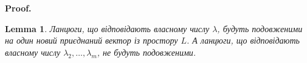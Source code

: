 \documentclass[a4paper, 10pt]{article}
\makeatletter
\def\qed{$\blacksquare$}
\theoremstyle{theoremdd}
\theoremstyle{theoremdd}
\theoremstyle{theoremdd}
\theoremstyle{theoremdd}
\theoremstyle{theoremdd}
\theoremstyle{theoremdd}
\theoremstyle{theoremdd}
\newtheorem{lemma}[theorem]{Lemma}
\theoremstyle{theoremdd}
\renewenvironment{proof}[1][Proof.\\]{\par
\pushQED{\hfill \qed}%
\normalfont \topsep6\p@\@plus6\p@\relax
\trivlist
\item\relax
{\bfseries
#1\@addpunct{.}}\hspace\labelsep\ignorespaces
}{%
\popQED\endtrivlist\@endpefalse
}
\makeatother
\begin{document}
\begin{proof}
\iffalse
\begin{lemma}
$\Im B = L_1 \dot{+} L_2 \dot{+} \dots \dot{+} L_m$.
\end{lemma}

\begin{proof}
Покажемо, що $L_j \cap L_i = \{0\}, j \neq i$. Справді,\\
$z \in L_j \cap L_i \Rightarrow z = \left[\begin{gathered} z^0_j f_j + z^1_j h^1_j + \dots + z_j^{k_j} h_j^{k_j} \\ z_i^0f_i + z_i^1 h_i^1 + \dots + z_i^{k_i} h_i^{k_i} \end{gathered} \right.$\\
$\implies z^0_j f_j + z^1_j h^1_j + \dots + z_j^{k_j} h_j^{k_j} + (-z_i^0)f_i + (-z_i^1) h_i^1 + \dots + (-z_i^{k_i}) h_i^{k_i} = 0$\\
За побудовою, $\{L_j, L_i\}$ - елементи з базису $\Im B$, тому є л.н.з.\\
$\implies z^0_j = z^1_j = \dots = z^{k_j}_j = z^0_i = z^1_i = \dots = z^{k_i}_i = 0$\\
Отже, $z = 0$, а тому $L_j \cap L_i = \{0\}$.\\
Таким чином, отримали, що $\Im B = L_1 \dot{+} L_2 \dot{+} \dots \dot{+} L_m$.
\end{proof}
\fi

\begin{lemma}
Ланцюги, що відповідають власному числу $\lambda$, будуть подовженими на один новий приєднаний вектор із простору $L$. А ланцюги, що відповідають власному числу $\lambda_2,\dots,\lambda_m$, не будуть подовженими.
\end{lemma}


\end{proof}
\end{document}

